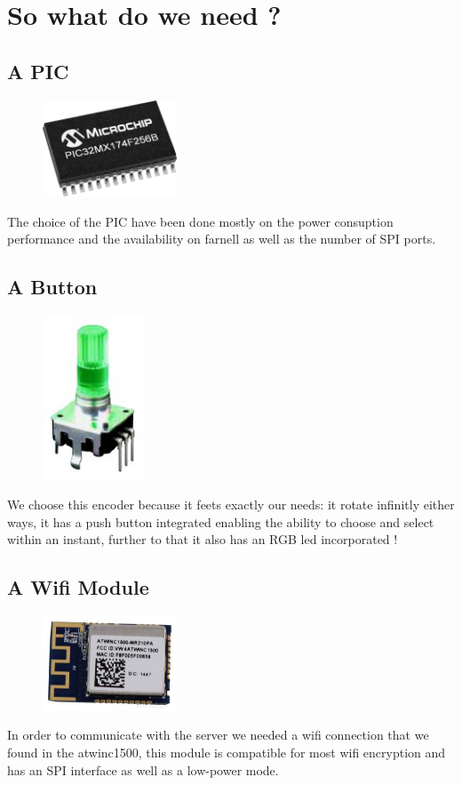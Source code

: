 \documentclass[12pt,a4paper,landscape]{article}
\begin{document}
\section*{So what do we need ?}
	\begin{multicols}{2}
	\subsection*{A PIC}
		\begin{figure}[H]
		\centering
		\includegraphics[width=4cm]{images/pic32.png}
		\end{figure}
		The choice of the PIC have been done mostly on the power consuption performance and the availability on farnell as well as the number of SPI ports.

	\subsection*{A Button}
			\begin{figure}[H]
			\centering
			\includegraphics[width=3cm]{images/rotary_encoder.png}
			\end{figure}
			We choose this encoder because it feets exactly our needs: it rotate infinitly either ways, it has a push button integrated enabling the ability to choose and select within an instant, further to that it also has an RGB led incorporated !

	\subsection*{A Wifi Module}
			\begin{figure}[H]
			\centering
			\includegraphics[width=4cm]{images/atwinc1500.png}
			\end{figure}
			In order to communicate with the server we needed a wifi connection that we found in the atwinc1500, this module is compatible for most wifi encryption and has an SPI interface as well as a low-power mode.


\end{multicols}
\end{document}
